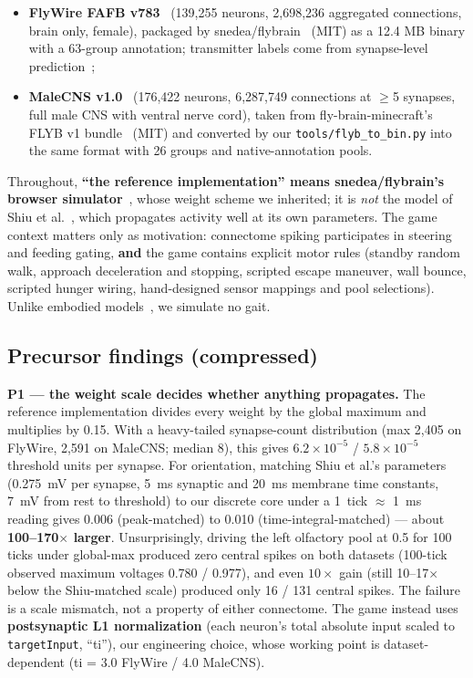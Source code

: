 \documentclass[11pt,a4paper]{article}
\begin{document}
\begin{itemize}
\item \textbf{FlyWire FAFB v783}~\cite{zheng2018,dorkenwald2024,schlegel2024}
(139,255 neurons, 2,698,236 aggregated connections, brain only, female),
packaged by snedea/flybrain~\cite{snedea} (MIT) as a 12.4 MB binary with a
63-group annotation; transmitter labels come from synapse-level
prediction~\cite{eckstein2024};
\item \textbf{MaleCNS v1.0}~\cite{berg2026} (176,422 neurons, 6,287,749
connections at $\ge$5 synapses, full male CNS with ventral nerve cord), taken
from fly-brain-minecraft's FLYB v1 bundle~\cite{fbm} (MIT) and converted by
our \texttt{tools/flyb\_to\_bin.py} into the same format with 26 groups and
native-annotation pools.
\end{itemize}

Throughout, \textbf{``the reference implementation'' means snedea/flybrain's
browser simulator}~\cite{snedea}, whose weight scheme we inherited; it is
\emph{not} the model of Shiu et al.~\cite{shiu2024}, which propagates activity
well at its own parameters. The game context matters only as motivation:
connectome spiking participates in steering and feeding gating, \textbf{and}
the game contains explicit motor rules (standby random walk, approach
deceleration and stopping, scripted escape maneuver, wall bounce, scripted
hunger wiring, hand-designed sensor mappings and pool selections). Unlike
embodied models~\cite{wangchen2024}, we simulate no gait.

\subsection{Precursor findings (compressed)}

\textbf{P1 --- the weight scale decides whether anything propagates.} The
reference implementation divides every weight by the global maximum and
multiplies by 0.15. With a heavy-tailed synapse-count distribution (max 2,405
on FlyWire, 2,591 on MaleCNS; median 8), this gives
$6.2\times10^{-5}$ / $5.8\times10^{-5}$ threshold units per synapse. For
orientation, matching Shiu et al.'s parameters (0.275~mV per synapse, 5~ms
synaptic and 20~ms membrane time constants, 7~mV from rest to threshold) to
our discrete core under a 1~tick $\approx$ 1~ms reading gives 0.006
(peak-matched) to 0.010 (time-integral-matched) --- about
\textbf{100--170$\times$ larger}. Unsurprisingly, driving the left olfactory
pool at 0.5 for 100 ticks under global-max produced zero central spikes on
both datasets (100-tick observed maximum voltages 0.780 / 0.977), and even
$10\times$ gain (still 10--17$\times$ below the Shiu-matched scale) produced
only 16 / 131 central spikes. The failure is a scale mismatch, not a property
of either connectome. The game instead uses \textbf{postsynaptic L1
normalization} (each neuron's total absolute input scaled to
\texttt{targetInput}, ``ti''), our engineering choice, whose working point is
dataset-dependent (ti = 3.0 FlyWire / 4.0 MaleCNS).
\end{document}
